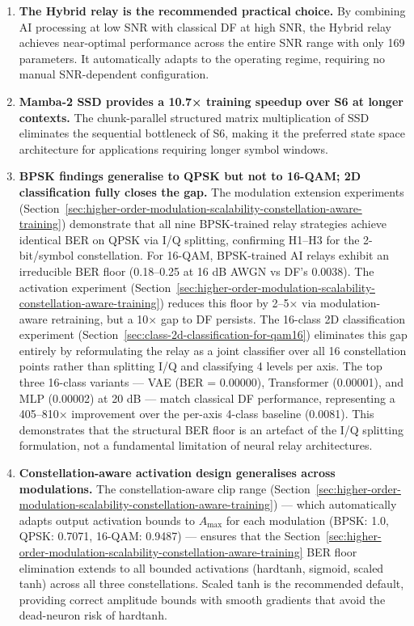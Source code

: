 \begin{enumerate}
  \textbf{MMSE-SIC provides the best MIMO equalization.} The non-linear SIC technique consistently outperforms both ZF and MMSE for all relay types, confirming the benefit of successive interference cancellation in the spatial multiplexing setting. The equalization gains are additive to the relay processing gains.
\item
  \textbf{The Hybrid relay is the recommended practical choice.} By combining AI processing at low SNR with classical DF at high SNR, the Hybrid relay achieves near-optimal performance across the entire SNR range with only 169 parameters. It automatically adapts to the operating regime, requiring no manual SNR-dependent configuration.
\item
  \textbf{Mamba-2 SSD provides a 10.7× training speedup over S6 at longer contexts.} The chunk-parallel structured matrix multiplication of SSD eliminates the sequential bottleneck of S6, making it the preferred state space architecture for applications requiring longer symbol windows.
\item
  \textbf{BPSK findings generalise to QPSK but not to 16-QAM; 2D classification fully closes the gap.} The modulation extension experiments (Section~\ref{sec:higher-order-modulation-scalability-constellation-aware-training}) demonstrate that all nine BPSK-trained relay strategies achieve identical BER on QPSK via I/Q splitting, confirming H1--H3 for the 2-bit/symbol constellation. For 16-QAM, BPSK-trained AI relays exhibit an irreducible BER floor (0.18--0.25 at 16 dB AWGN vs DF's 0.0038). The activation experiment (Section~\ref{sec:higher-order-modulation-scalability-constellation-aware-training}) reduces this floor by 2--5× via modulation-aware retraining, but a 10× gap to DF persists. The 16-class 2D classification experiment (Section~\ref{sec:class-2d-classification-for-qam16}) eliminates this gap entirely by reformulating the relay as a joint classifier over all 16 constellation points rather than splitting I/Q and classifying 4 levels per axis. The top three 16-class variants --- VAE (BER = 0.00000), Transformer (0.00001), and MLP (0.00002) at 20 dB --- match classical DF performance, representing a 405--810× improvement over the per-axis 4-class baseline (0.0081). This demonstrates that the structural BER floor is an artefact of the I/Q splitting formulation, not a fundamental limitation of neural relay architectures.
\item
  \textbf{Constellation-aware activation design generalises across modulations.} The constellation-aware clip range (Section~\ref{sec:higher-order-modulation-scalability-constellation-aware-training}) --- which automatically adapts output activation bounds to \(A_{\max}\) for each modulation (BPSK: 1.0, QPSK: 0.7071, 16-QAM: 0.9487) --- ensures that the Section~\ref{sec:higher-order-modulation-scalability-constellation-aware-training} BER floor elimination extends to all bounded activations (hardtanh, sigmoid, scaled tanh) across all three constellations. Scaled tanh is the recommended default, providing correct amplitude bounds with smooth gradients that avoid the dead-neuron risk of hardtanh.

\end{enumerate}
